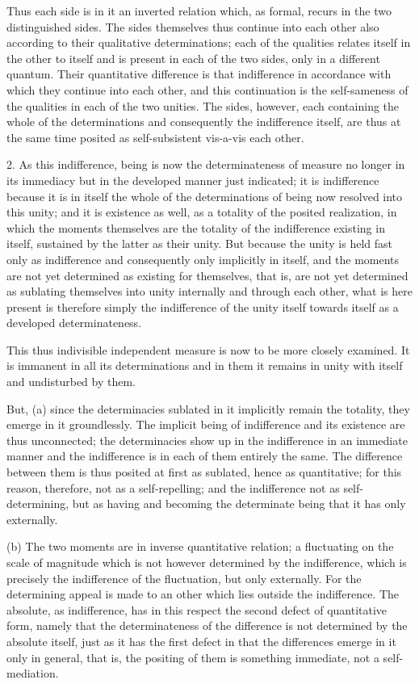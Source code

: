 Thus each side is in it an inverted relation
which, as formal, recurs in the two distinguished sides.
The sides themselves thus continue into each other
also according to their qualitative determinations;
each of the qualities relates itself in the other to itself
and is present in each of the two sides,
only in a different quantum.
Their quantitative difference is that indifference
in accordance with which they continue into each other,
and this continuation is the self-sameness of the qualities
in each of the two unities.
The sides, however, each containing
the whole of the determinations
and consequently the indifference itself,
are thus at the same time posited as
self-subsistent vis-a-vis each other.

2. As this indifference,
being is now the determinateness of measure
no longer in its immediacy
but in the developed manner just indicated;
it is indifference because it is in itself
the whole of the determinations of being
now resolved into this unity;
and it is existence as well,
as a totality of the posited realization,
in which the moments themselves are the totality of
the indifference existing in itself,
sustained by the latter as their unity.
But because the unity is held fast only as indifference
and consequently only implicitly in itself,
and the moments are not yet determined
as existing for themselves,
that is, are not yet determined as
sublating themselves into unity internally
and through each other,
what is here present is therefore simply
the indifference of the unity itself
towards itself as a developed determinateness.

This thus indivisible independent measure is
now to be more closely examined.
It is immanent in all its determinations
and in them it remains in unity with itself
and undisturbed by them.

But, (a) since the determinacies
sublated in it implicitly remain the totality,
they emerge in it groundlessly.
The implicit being of indifference
and its existence are thus unconnected;
the determinacies show up in the indifference in an immediate manner
and the indifference is in each of them entirely the same.
The difference between them is
thus posited at first as sublated, hence as quantitative;
for this reason, therefore, not as a self-repelling;
and the indifference not as self-determining,
but as having and becoming the determinate being
that it has only externally.

(b) The two moments are in inverse quantitative relation;
a fluctuating on the scale of magnitude
which is not however determined by the indifference,
which is precisely the indifference of the fluctuation,
but only externally.
For the determining appeal is made to an other
which lies outside the indifference.
The absolute, as indifference, has in this respect
the second defect of quantitative form,
namely that the determinateness of the difference is
not determined by the absolute itself,
just as it has the first defect in that
the differences emerge in it only in general, that is,
the positing of them is something immediate,
not a self-mediation.

